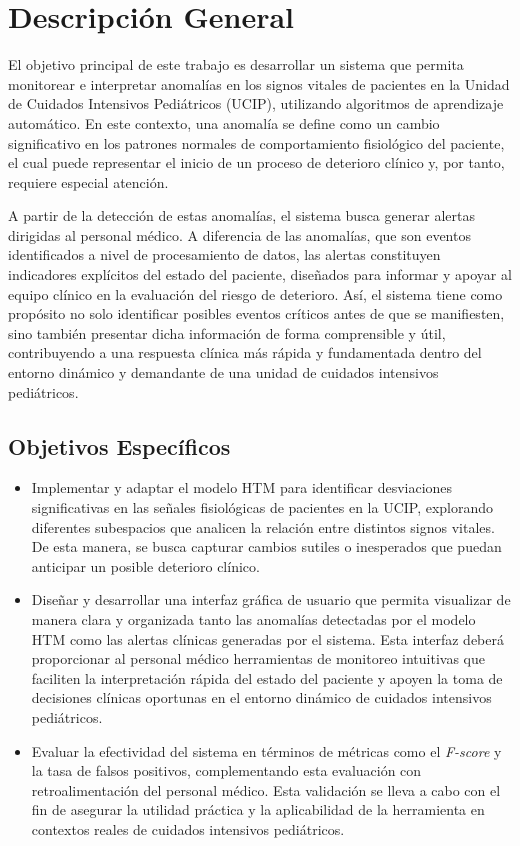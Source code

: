 \chapter{Descripción General}

El objetivo principal de este trabajo es desarrollar un sistema que permita monitorear e interpretar anomalías en los signos vitales de pacientes en la Unidad de Cuidados Intensivos Pediátricos (UCIP), utilizando algoritmos de aprendizaje automático. En este contexto, una anomalía se define como un cambio significativo en los patrones normales de comportamiento fisiológico del paciente, el cual puede representar el inicio de un proceso de deterioro clínico y, por tanto, requiere especial atención.

A partir de la detección de estas anomalías, el sistema busca generar alertas dirigidas al personal médico. A diferencia de las anomalías, que son eventos identificados a nivel de procesamiento de datos, las alertas constituyen indicadores explícitos del estado del paciente, diseñados para informar y apoyar al equipo clínico en la evaluación del riesgo de deterioro. Así, el sistema tiene como propósito no solo identificar posibles eventos críticos antes de que se manifiesten, sino también presentar dicha información de forma comprensible y útil, contribuyendo a una respuesta clínica más rápida y fundamentada dentro del entorno dinámico y demandante de una unidad de cuidados intensivos pediátricos.

\section{Objetivos Específicos}

\begin{itemize}
  \item Implementar y adaptar el modelo HTM para identificar desviaciones significativas en las señales fisiológicas de pacientes en la UCIP, explorando diferentes subespacios que analicen la relación entre distintos signos vitales. De esta manera, se busca capturar cambios sutiles o inesperados que puedan anticipar un posible deterioro clínico.

  \item  Diseñar y desarrollar una interfaz gráfica de usuario que permita visualizar de manera clara y organizada tanto las anomalías detectadas por el modelo HTM como las alertas clínicas generadas por el sistema. Esta interfaz deberá proporcionar al personal médico herramientas de monitoreo intuitivas que faciliten la interpretación rápida del estado del paciente y apoyen la toma de decisiones clínicas oportunas en el entorno dinámico de cuidados intensivos pediátricos.

  \item  Evaluar la efectividad del sistema en términos de métricas como el \textit{F-score} y la tasa de falsos positivos, complementando esta evaluación con retroalimentación del personal médico. Esta validación se lleva a cabo con el fin de asegurar la utilidad práctica y la aplicabilidad de la herramienta en contextos reales de cuidados intensivos pediátricos.

\end{itemize}

